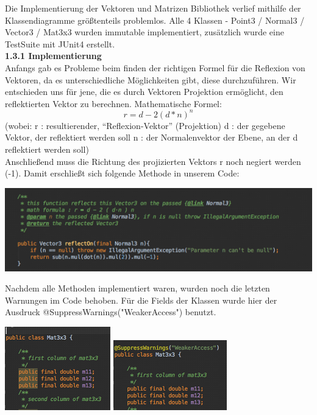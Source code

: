 \documentclass[]{article}
\begin{document}
Die Implementierung der Vektoren und Matrizen Bibliothek verlief mithilfe der Klassendiagramme größtenteils problemlos.
Alle 4 Klassen - Point3 / Normal3 / Vector3 / Mat3x3 wurden immutable implementiert, zusätzlich wurde eine TestSuite mit JUnit4 erstellt.\\

\textbf{1.3.1 Implementierung}\\

Anfangs gab es Probleme beim finden der richtigen Formel für die Reflexion von Vektoren, da es unterschiedliche Möglichkeiten gibt, diese durchzuführen. 
Wir entschieden uns für jene, die es durch Vektoren Projektion ermöglicht, den reflektierten Vektor zu berechnen.
Mathematische Formel:
\[ r = d - 2 (d*n)^n\] 
(wobei: 
r :    resultierender, “Reflexion-Vektor” (Projektion)
d :    der gegebene Vektor, der reflektiert werden soll
n :    der Normalenvektor der Ebene, an der  d  reflektiert werden soll)\\
Anschließend muss die Richtung des projizierten Vektors  r  noch negiert werden (-1).
Damit erschließt sich folgende Methode in unserem Code:\\

\begin{center}
\includegraphics[scale=1]{02.png}\\
\end{center}


Nachdem alle Methoden implementiert waren, wurden noch die letzten Warnungen im Code behoben. Für die Fields der Klassen wurde hier der Ausdruck 
@SuppressWarnings("WeakerAccess")
benutzt.\\

\begin{center}
\includegraphics[scale=1]{03.png}
\includegraphics[scale=1]{04.png}\\  
\end{center}
\end{document}
